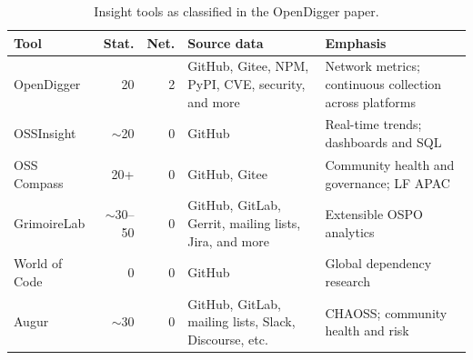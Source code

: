 \begin{table}[tbp]
\centering
\caption{Insight tools as classified in the OpenDigger paper.}\label{tab:ch6-tools}
\fontsize{9}{11.1}\selectfont
\renewcommand{\arraystretch}{1.13}
\begin{tabularx}{\textwidth}{@{}p{22mm}rr>{\raggedright\arraybackslash}X>{\raggedright\arraybackslash}X@{}}
\toprule
Tool & Stat. & Net. & Source data & Emphasis\\
\midrule
OpenDigger & 20 & 2 & GitHub, Gitee, NPM, PyPI, CVE, security, and more & Network metrics; continuous collection across platforms\\
OSSInsight & $\sim$20 & 0 & GitHub & Real-time trends; dashboards and SQL\\
OSS Compass & 20+ & 0 & GitHub, Gitee & Community health and governance; LF APAC\\
GrimoireLab & $\sim$30--50 & 0 & GitHub, GitLab, Gerrit, mailing lists, Jira, and more & Extensible OSPO analytics\\
World of Code & 0 & 0 & GitHub & Global dependency research\\
Augur & $\sim$30 & 0 & GitHub, GitLab, mailing lists, Slack, Discourse, etc. & CHAOSS; community health and risk\\
\bottomrule
\end{tabularx}
\end{table}
